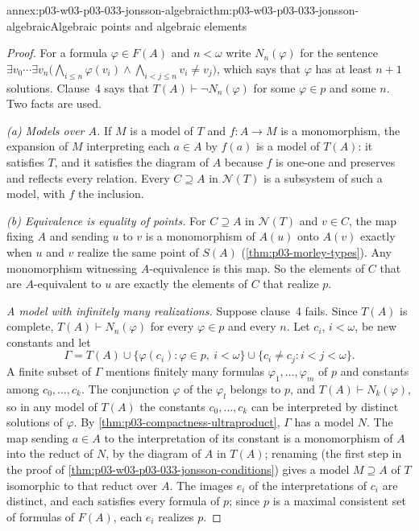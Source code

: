 \begin{annexitem}{annex:p03-w03-p03-033-jonsson-algebraic}{thm:p03-w03-p03-033-jonsson-algebraic}{Algebraic points and algebraic elements}
\begin{proof}
For a formula \(\varphi\in F(A)\) and \(n<\omega\) write
\(N_n(\varphi)\) for the sentence
\(\exists v_0\cdots\exists v_n\bigl(\bigwedge_{i\leq n}\varphi(v_i)
\wedge\bigwedge_{i<j\leq n}v_i\neq v_j\bigr)\), which says that
\(\varphi\) has at least \(n+1\) solutions. Clause~4 says that
\(T(A)\vdash\neg N_n(\varphi)\) for some \(\varphi\in p\) and some \(n\).
Two facts are used.

\emph{(a) Models over \(A\).} If \(M\) is a model of \(T\) and
\(f:A\to M\) is a monomorphism, the expansion of \(M\) interpreting each
\(a\in A\) by \(f(a)\) is a model of \(T(A)\): it satisfies \(T\), and it
satisfies the diagram of \(A\) because \(f\) is one-one and preserves and
reflects every relation. Every \(C\supseteq A\) in \(\mathcal N(T)\) is a
subsystem of such a model, with \(f\) the inclusion.

\emph{(b) Equivalence is equality of points.} For \(C\supseteq A\) in
\(\mathcal N(T)\) and \(v\in C\), the map fixing \(A\) and sending \(u\)
to \(v\) is a monomorphism of \(A(u)\) onto \(A(v)\) exactly when \(u\)
and \(v\) realize the same point of \(S(A)\)
(\cref{thm:p03-morley-types}). Any monomorphism witnessing
\(A\)-equivalence is this map. So the elements of \(C\) that are
\(A\)-equivalent to \(u\) are exactly the elements of \(C\) that realize
\(p\).

\emph{A model with infinitely many realizations.} Suppose clause~4 fails.
Since \(T(A)\) is complete, \(T(A)\vdash N_n(\varphi)\) for every
\(\varphi\in p\) and every \(n\). Let \(c_i\), \(i<\omega\), be new
constants and let
\[
 \Gamma=T(A)\cup\{\varphi(c_i):\varphi\in p,\ i<\omega\}
 \cup\{c_i\neq c_j:i<j<\omega\}.
\]
A finite subset of \(\Gamma\) mentions finitely many formulas
\(\varphi_1,\dots,\varphi_m\) of \(p\) and constants among
\(c_0,\dots,c_k\). The conjunction \(\varphi\) of the \(\varphi_l\)
belongs to \(p\), and \(T(A)\vdash N_k(\varphi)\), so in any model of
\(T(A)\) the constants \(c_0,\dots,c_k\) can be interpreted by distinct
solutions of \(\varphi\). By \cref{thm:p03-compactness-ultraproduct},
\(\Gamma\) has a model \(N\). The map sending \(a\in A\) to the
interpretation of its constant is a monomorphism of \(A\) into the reduct
of \(N\), by the diagram of \(A\) in \(T(A)\); renaming
(the first step in the proof of \cref{thm:p03-w03-p03-033-jonsson-conditions}) gives a model
\(M\supseteq A\) of \(T\) isomorphic to that reduct over \(A\). The
images \(e_i\) of the interpretations of \(c_i\) are distinct, and each
satisfies every formula of \(p\); since \(p\) is a maximal consistent set
of formulas of \(F(A)\), each \(e_i\) realizes \(p\).


\end{proof}
\end{annexitem}
